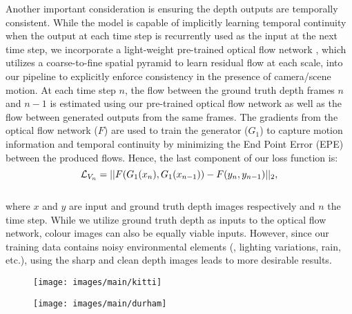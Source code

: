 \documentclass[10pt,twocolumn,letterpaper]{article}
\begin{document}
Another important consideration is ensuring the depth outputs are temporally consistent. While the model is capable of implicitly learning temporal continuity when the output at each time step is recurrently used as the input at the next time step, we incorporate a light-weight pre-trained optical flow network \cite{ranjan2017optical}, which utilizes a coarse-to-fine spatial pyramid to learn residual flow at each scale, into our pipeline to explicitly enforce consistency in the presence of camera/scene motion. At each time step $n$, the flow between the ground truth depth frames $n$ and $n-1$ is estimated using our pre-trained optical flow network \cite{ranjan2017optical} as well as the flow between generated outputs from the same frames. The gradients from the optical flow network ($F$) are used to train the generator ($G_1$) to capture motion information and temporal continuity by minimizing the End Point Error (EPE) between the produced flows. Hence, the last component of our loss function is: \vspace{-0.05cm}\begin{equation}  
   \mathcal{L}_{V_n}  = ||F(G_1(x_n), G_1(x_{n-1})) - F(y_n, y_{n-1}) ||_{2},
   \label{lossTemporal}\vspace{-0.4cm}
   \end{equation}\\
where $x$ and $y$ are input and ground truth depth images respectively and $n$ the time step. While we utilize ground truth depth as inputs to the optical flow network, colour images can also be equally viable inputs. However, since our training data contains noisy environmental elements (\eg, lighting variations, rain, etc.), using the sharp and clean depth images leads to more desirable results.\begin{figure*}[t!]
	\centering
	\texttt{[image: images/main/kitti]}
	\captionsetup[figure]{skip=7pt}
	\label{fig:kitti}\vspace{-0.4cm}
\end{figure*}
\begin{figure}[t!]
	\centering
	\texttt{[image: images/main/durham]}
	\captionsetup[figure]{skip=7pt}
	\label{fig:durham}\vspace{-0.6cm}
\end{figure}
\end{document}
